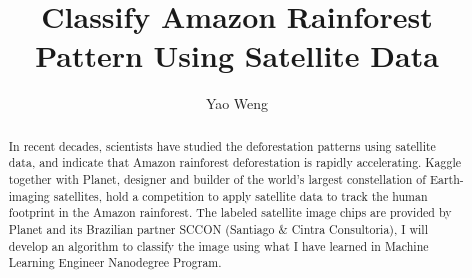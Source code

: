 \documentclass[11pt,oneside,a4paper]{article}
\date{}
\begin{document}

\title{Classify Amazon Rainforest Pattern Using Satellite Data}
\maketitle



\author{Yao Weng}


\begin{abstract}
In recent decades, scientists have studied the deforestation patterns using satellite data, and indicate that Amazon rainforest deforestation is rapidly accelerating. Kaggle together with Planet, designer and builder of the world’s largest constellation of Earth-imaging satellites, hold a competition to apply satellite data to track the human footprint in the Amazon rainforest. The labeled satellite image chips are provided by Planet and its Brazilian partner SCCON (Santiago $\&$ Cintra Consultoria), I will develop an algorithm to classify the image using what I have learned in Machine Learning Engineer Nanodegree Program.
\end{abstract}


\end{document}

